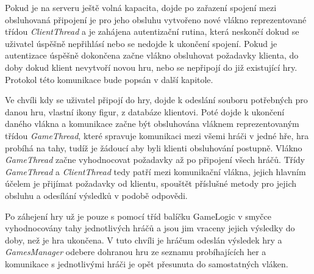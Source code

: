\documentclass[12pt]{article}
\begin{document}
Pokud je na serveru ještě volná kapacita, dojde po zařazení spojení mezi obsluhovaná připojení je pro jeho obsluhu vytvořeno nové vlákno reprezentované třídou \textit{ClientThread} a je zahájena autentizační rutina, která neskončí dokud se uživatel úspěšně nepřihlásí nebo se nedojde k ukončení spojení. Pokud je autentizace úspěšně dokončena začne vlákno obsluhovat požadavky klienta, do doby dokud klient nevytvoří novou hru, nebo se nepřipojí do již existující hry. Protokol této komunikace bude popsán v další kapitole.

Ve chvíli kdy se uživatel připojí do hry, dojde k odeslání souboru potřebných pro danou hru, vlastní ikony figur, z databáze klientovi. Poté dojde k ukončení daného vlákna a komunikace začne být obsluhována vláknem reprezentovaným třídou \textit{GameThread}, které spravuje komunikaci mezi všemi hráči v jedné hře, hra probíhá na tahy, tudíž je žádoucí aby byli klienti obsluhování postupně. Vlákno \textit{GameThread} začne vyhodnocovat požadavky až po připojení všech hráčů. Třídy \textit{GameThread} a \textit{ClientThread} tedy patří mezi komunikační vlákna, jejich hlavním účelem je přijímat požadavky od klientu, spouštět příslušné metody pro jejich obsluhu a odesílání výsledků v podobě odpovědi.

Po záhejení hry už je pouze s pomocí tříd balíčku GameLogic v smyčce vyhodnocovány tahy jednotlivých hráčů a jsou jim vraceny jejich výsledky do doby, než je hra ukončena. V tuto chvíli je hráčum odeslán výsledek hry a \textit{GamesManager} odebere dohranou hru ze seznamu probíhajících her a komunikace s jednotlivými hráči je opět přesunuta do samostatných vláken.
\end{document}
